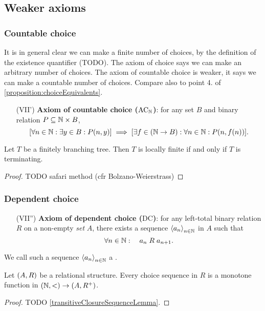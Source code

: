 \subsection{Weaker axioms}
\subsubsection{Countable choice}
It is in general clear we can make a finite number of choices, by the definition of the existence quantifier (TODO). The axiom of choice says we can make an arbitrary number of choices. The axiom of countable choice is weaker, it says we can make a countable number of choices. Compare also to point 4. of \ref{proposition:choiceEquivalents}.
\begin{enumerate}[(I)]
\setcounter{enumi}{6}
\item[(VII')] \textbf{Axiom of countable choice ($\text{AC}_{\mathbb{N}}$)}: for any set $B$ and binary relation $P\subseteq \mathbb{N}\times B$,
\[ [\forall n\in \mathbb{N}: \exists y\in B: P(n,y)] \implies [\exists f\in (\mathbb{N}\to B): \forall n \in \mathbb{N}: P(n,f(n))]. \]
\end{enumerate}

\begin{theorem}
Let $T$ be a finitely branching tree. Then $T$ is locally finite \textup{if and only if} $T$ is terminating.
\end{theorem}
\begin{proof}
TODO safari method (cfr Bolzano-Weierstrass)
\end{proof}

\subsubsection{Dependent choice}
\begin{enumerate}[(I)]
\setcounter{enumi}{6}
\item[(VII'')] \textbf{Axiom of dependent choice ($\text{DC}$)}: for any left-total binary relation $R$ on a non-empty \emph{set} $A$, there exists a sequence $\left\langle a_n \right\rangle_{n\in \mathbb{N}}$ in $A$ such that
\[ \forall n\in \mathbb{N}: \quad a_n\mathrel{R}a_{n+1}. \]
\end{enumerate}

\begin{definition}
We call such a sequence $\left\langle a_n \right\rangle_{n\in \mathbb{N}}$ a .
\end{definition}

\begin{lemma} \label{choiceSequenceMonotone}
Let $\sSet{A, R}$ be a relational structure. Every choice sequence in $R$ is a monotone function in $\sSet{\N, <} \to \sSet{A, R^+}$.
\end{lemma}
\begin{proof}
TODO \ref{transitiveClosureSequenceLemma}.
\end{proof}


